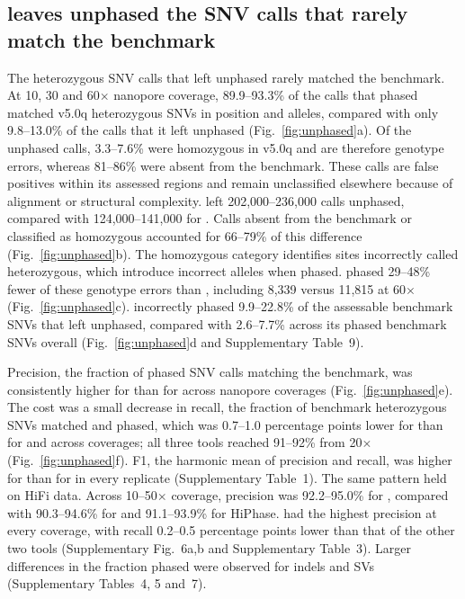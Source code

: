 \subsection*{\toolname leaves unphased the SNV calls that rarely match the benchmark}
The heterozygous SNV calls that \toolname left unphased rarely matched the benchmark. At 10, 30 and 60$\times$ nanopore coverage, 89.9--93.3\% of the calls that \toolname phased matched v5.0q heterozygous SNVs in position and alleles, compared with only 9.8--13.0\% of the calls that it left unphased (Fig.~\ref{fig:unphased}a). Of the unphased calls, 3.3--7.6\% were homozygous in v5.0q and are therefore genotype errors, whereas 81--86\% were absent from the benchmark. These calls are false positives within its assessed regions and remain unclassified elsewhere because of alignment or structural complexity\cite{olson2026giabv5}. \toolname left 202,000--236,000 calls unphased, compared with 124,000--141,000 for \whatshap. Calls absent from the benchmark or classified as homozygous accounted for 66--79\% of this difference (Fig.~\ref{fig:unphased}b). The homozygous category identifies sites incorrectly called heterozygous, which introduce incorrect alleles when phased. \toolname phased 29--48\% fewer of these genotype errors than \whatshap, including 8,339 versus 11,815 at 60$\times$ (Fig.~\ref{fig:unphased}c). \whatshap incorrectly phased 9.9--22.8\% of the assessable benchmark SNVs that \toolname left unphased, compared with 2.6--7.7\% across its phased benchmark SNVs overall (Fig.~\ref{fig:unphased}d and Supplementary Table~9).

Precision, the fraction of phased SNV calls matching the benchmark, was consistently higher for \toolname than for \whatshap across nanopore coverages (Fig.~\ref{fig:unphased}e). The cost was a small decrease in recall, the fraction of benchmark heterozygous SNVs matched and phased, which was 0.7--1.0 percentage points lower for \toolname than for \whatshap and \hapcut across coverages; all three tools reached 91--92\% from 20$\times$ (Fig.~\ref{fig:unphased}f). F1, the harmonic mean of precision and recall, was higher for \toolname than for \whatshap in every replicate (Supplementary Table~1). The same pattern held on HiFi data. Across 10--50$\times$ coverage, precision was 92.2--95.0\% for \toolname, compared with 90.3--94.6\% for \whatshap and 91.1--93.9\% for HiPhase. \toolname had the highest precision at every coverage, with recall 0.2--0.5 percentage points lower than that of the other two tools (Supplementary Fig.~6a,b and Supplementary Table~3). Larger differences in the fraction phased were observed for indels and SVs (Supplementary Tables~4, 5 and~7).

